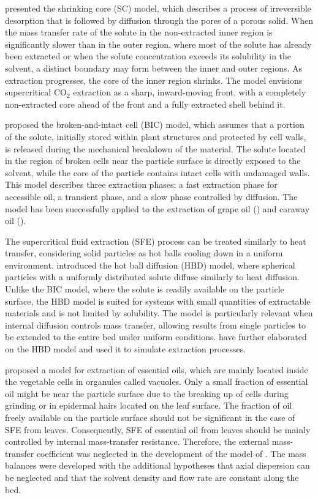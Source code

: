 \documentclass[a4paper,fleqn]{cas-dc}
\begin{document}
	\citet{Goto1996} presented the shrinking core (SC) model, which describes a process of irreversible desorption that is followed by diffusion through the pores of a porous solid. When the mass transfer rate of the solute in the non-extracted inner region is significantly slower than in the outer region, where most of the solute has already been extracted or when the solute concentration exceeds its solubility in the solvent, a distinct boundary may form between the inner and outer regions. As extraction progresses, the core of the inner region shrinks. The model envisions supercritical CO$_2$ extraction as a sharp, inward-moving front, with a completely non-extracted core ahead of the front and a fully extracted shell behind it.
	
	\citet{Sovova1994} proposed the broken-and-intact cell (BIC) model, which assumes that a portion of the solute, initially stored within plant structures and protected by cell walls, is released during the mechanical breakdown of the material. The solute located in the region of broken cells near the particle surface is directly exposed to the solvent, while the core of the particle contains intact cells with undamaged walls. This model describes three extraction phases: a fast extraction phase for accessible oil, a transient phase, and a slow phase controlled by diffusion. The model has been successfully applied to the extraction of grape oil (\citet{Sovova1994b}) and caraway oil (\citet{Sovova1994a}).
	
	The supercritical fluid extraction (SFE) process can be treated similarly to heat transfer, considering solid particles as hot balls cooling down in a uniform environment. \citet{Bartle1990} introduced the hot ball diffusion (HBD) model, where spherical particles with a uniformly distributed solute diffuse similarly to heat diffusion. Unlike the BIC model, where the solute is readily available on the particle surface, the HBD model is suited for systems with small quantities of extractable materials and is not limited by solubility. The model is particularly relevant when internal diffusion controls mass transfer, allowing results from single particles to be extended to the entire bed under uniform conditions. \citet{Reverchon1993} have further elaborated on the HBD model and used it to simulate extraction processes.
	
	\citet{Reverchon1996} proposed a model for extraction of essential oils, which are mainly located inside the vegetable cells in organules called vacuoles. Only a small fraction of essential oil might be near the particle surface due to the breaking up of cells during grinding or in epidermal hairs located on the leaf surface. The fraction of oil freely available on the particle surface should not be significant in the case of SFE from leaves. Consequently, SFE of essential oil from leaves should be mainly controlled by  internal mass-transfer resistance. Therefore, the external mass-transfer coefficient was neglected in the development of the model of \citet{Reverchon1996}. The mass balances were developed with the additional hypotheses that axial dispersion can be neglected and that the solvent density and flow rate are constant along the bed.
	
\end{document}

